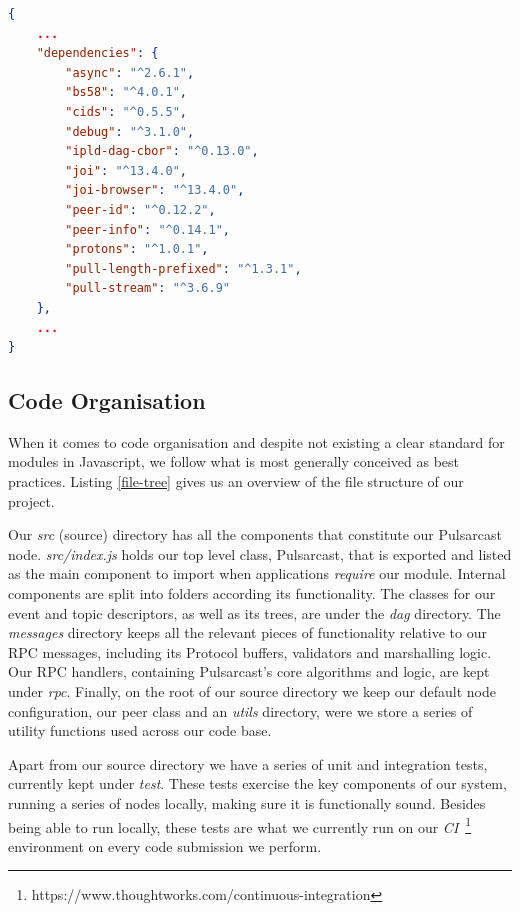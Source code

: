\noindent\begin{minipage}{\textwidth}
\vspace{8pt}
\begin{lstlisting}[language=JSON,caption={Pulsarcast module dependency list},label={dependencies}]
{
	...
	"dependencies": {
		"async": "^2.6.1",
		"bs58": "^4.0.1",
		"cids": "^0.5.5",
		"debug": "^3.1.0",
		"ipld-dag-cbor": "^0.13.0",
		"joi": "^13.4.0",
		"joi-browser": "^13.4.0",
		"peer-id": "^0.12.2",
		"peer-info": "^0.14.1",
		"protons": "^1.0.1",
		"pull-length-prefixed": "^1.3.1",
		"pull-stream": "^3.6.9"
	},
	...
}
\end{lstlisting}
\vspace{8pt}
\end{minipage}

\subsection{Code Organisation}\label{subsec:code-organisation}

When it comes to code organisation and despite not existing a clear standard
for modules in Javascript, we follow what is most generally conceived as best
practices. Listing \ref{file-tree} gives us an overview of the file structure
of our project. 

Our \emph{src} (source) directory has all the components that constitute our
Pulsarcast node. \emph{src/index.js} holds our top level class, Pulsarcast,
that is exported and listed as the main component to import when applications
\emph{require} our module. Internal components are split into folders according
its functionality. The classes for our event and topic descriptors, as well as
its trees, are under the \emph{dag} directory. The \emph{messages} directory
keeps all the relevant pieces of functionality relative to our RPC messages,
including its Protocol buffers, validators and marshalling logic. Our RPC
handlers, containing Pulsarcast's core algorithms and logic, are kept under
\emph{rpc}. Finally, on the root of our source directory we keep our default
node configuration, our peer class and an \emph{utils} directory, were we store
a series of utility functions used across our code base.

Apart from our source directory we have a series of unit and integration tests,
currently kept under \emph{test}. These tests exercise the key components of
our system, running a series of nodes locally, making sure it is functionally
sound. Besides being able to run locally, these tests are what we currently run
on our \emph{CI}~\footnote{https://www.thoughtworks.com/continuous-integration}
environment on every code submission we perform.

